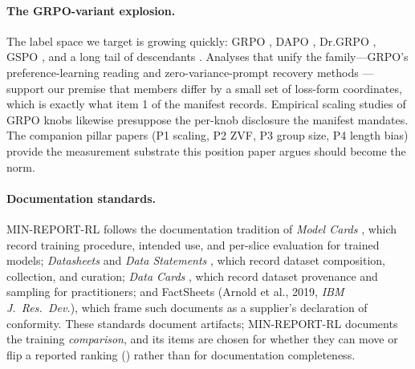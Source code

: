 \paragraph{The GRPO-variant explosion.} The label space we target is growing
quickly: GRPO \citep{shao2024deepseekmath, guo2025deepseekr1}, DAPO
\citep{yu2025dapo}, Dr.GRPO \citep{tong2025drgrpo}, GSPO \citep{qwen2025gspo},
and a long tail of descendants \citep{nan2025ngrpo,
zhang2025scaffgrpo, lu2025grpolead, bytedance2025vapo}. Analyses that unify
the family---GRPO's preference-learning reading \citep{rafailov2024direct,
wu2025grpodpo} and zero-variance-prompt recovery methods \citep{le2025rlzvp}
---support our premise that members differ by a small set of loss-form
coordinates, which is exactly what item 1 of the manifest records. Empirical
scaling studies of GRPO knobs \citep{tan2025scalingrl} likewise presuppose
the per-knob disclosure the manifest mandates. The companion \ours{} pillar
papers (P1 scaling, P2 ZVF, P3 group size, P4 length bias) provide the
measurement substrate this position paper argues should become the norm.

\paragraph{Documentation standards.} MIN-REPORT-RL follows the documentation
tradition of \emph{Model Cards} \citep{mitchell2019modelcards}, which record
training procedure, intended use, and per-slice evaluation for trained models;
\emph{Datasheets} \citep{gebru2021datasheets} and \emph{Data Statements}
\citep{bender2018datastatements}, which record dataset composition,
collection, and curation; \emph{Data Cards} \citep{pushkarna2022datacards},
which record dataset provenance and sampling for practitioners; and
FactSheets (Arnold et al., 2019, \emph{IBM J.\ Res.\ Dev.}), which frame such
documents as a supplier's declaration of conformity. These standards document
artifacts; MIN-REPORT-RL documents the training \emph{comparison}, and its
items are chosen for whether they can move or flip a reported ranking
() rather than for documentation completeness.

